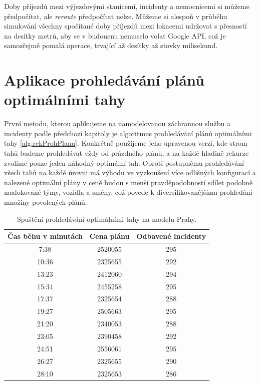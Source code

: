 Doby příjezdů mezi výjezdovými stanicemi, incidenty a nemocnicemi si můžeme předpočítat, ale \textit{reroute} předpočítat nelze.
Můžeme si alespoň v průběhu simulování všechny spočítané doby příjezdů mezi lokacemi udržovat s přesností na desítky metrů,
aby se v budoucnu nemuselo volat Google API, což je samozřejmě pomalá operace, trvající až desítky až stovky milisekund. 

\section{Aplikace prohledávání plánů optimálními \linebreak tahy}

První metodu, kterou aplikujeme na namodelovanou záchrannou službu a incidenty podle předchozí kapitoly je algoritmus prohledávání plánů optimálními tahy \ref{alg:rekProhPlanu}.
Konkrétně použijeme jeho upravenou verzi, kde strom tahů budeme prohledávat vždy od prázdného plánu, a na každé hladině rekurze zvolíme pouze jeden náhodný optimální tah.
Oproti postupnému prohledávání všech tahů na každé úrovni má výhodu ve vyzkoušení více odlišných konfigurací a nalezené optimální plány v ceně budou s menší pravděpodobností sdílet
podobně naalokované týmy, vozidla a směny, což povede k diversifikovanějšímu prohledání množiny povolených plánů.

\begin{table}[h!]
\centering
\begin{tabular}{|c|c|c|}
\hline
\textbf{Čas běhu v minutách} & \textbf{Cena plánu} & \textbf{Odbavené incidenty} \\
\hline
7:38  & 2520055 & 295 \\
\hline
10:36 & 2325655 & 292 \\
\hline
13:23 & 2412060 & 294 \\
\hline
15:34 & 2455258 & 295 \\
\hline
17:37 & 2325654 & 288 \\
\hline
19:27 & 2505663 & 295 \\
\hline
21:20 & 2340053 & 288 \\
\hline
23:05 & 2390458 & 292 \\
\hline
24:51 & 2556061 & 295 \\
\hline
26:27 & 2325655 & 290 \\
\hline
28:10 & 2325653 & 286 \\
\hline
\end{tabular}
\caption{Spuštění prohledávání optimálními tahy na modelu Prahy.}
\label{table:optimalMovesTabulka}
\end{table}

